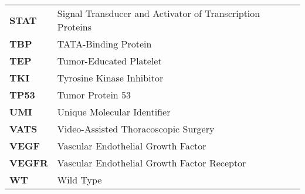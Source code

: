 \begin{longtable}[l]{l l}
    \textbf{STAT} & Signal Transducer and Activator of Transcription Proteins \\
    \textbf{TBP} & TATA-Binding Protein \\
    \textbf{TEP} & Tumor-Educated Platelet \\
    \textbf{TKI} & Tyrosine Kinase Inhibitor \\
    \textbf{TP53} & Tumor Protein 53 \\
    \textbf{UMI} & Unique Molecular Identifier \\
    \textbf{VATS} & Video-Assisted Thoracoscopic Surgery \\
    \textbf{VEGF} & Vascular Endothelial Growth Factor \\
    \textbf{VEGFR} & Vascular Endothelial Growth Factor Receptor \\
    \textbf{WT} & Wild Type 
\end{longtable}

\normalsize